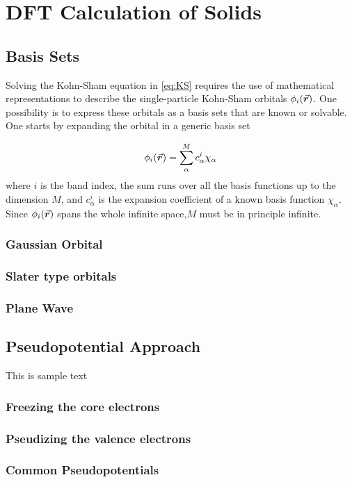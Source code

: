 \chapter{DFT Calculation of Solids}
\section{Basis Sets}
Solving the Kohn-Sham equation in \eqref{eq:KS} requires the use of mathematical representations to describe the single-particle Kohn-Sham orbitals $\phi_i(\va*{r})$. One possibility is to express these orbitals as a basis sets that are known or solvable. One starts by expanding the orbital in a generic basis set 

\begin{equation}
    \phi_i(\va*{r}) = \sum^M_\alpha c^i_\alpha \chi_\alpha
\end{equation}
where $i$ is the band index, the sum runs over all the basis functions up to the dimension $M$, and $c^i_\alpha$ is the expansion coefficient of a known basis function $\chi_\alpha$. Since $\phi_i(\va*{r})$ spans the whole infinite space,$M$ must be in principle infinite. 



    \subsection{Gaussian Orbital}
    \subsection{Slater type orbitals}
    \subsection{Plane Wave}

\section{Pseudopotential Approach}
    This is sample text
    \subsection{Freezing the core electrons}
    \subsection{Pseudizing the valence electrons}
    \subsection{Common Pseudopotentials}
